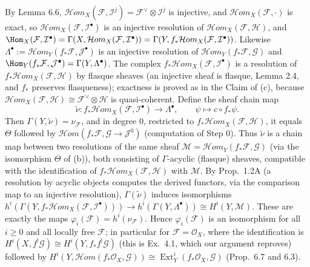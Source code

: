 \documentclass[11pt]{article}
\begin{document}
By Lemma 6.6, $\mathcal{H}om_X(\mathcal F,\mathcal I^j)=\mathcal F^\vee\otimes\mathcal I^j$ is injective, and $\mathcal{H}om_X(\mathcal F,\cdot)$ is exact, so $\mathcal{H}om_X(\mathcal F,\mathcal I^\bullet)$ is an injective resolution of $\mathcal{H}om_X(\mathcal F,\mathcal H)$, and $\Hom_X(\mathcal F,\mathcal I^\bullet)=\Gamma(X,\mathcal{H}om_X(\mathcal F,\mathcal I^\bullet))=\Gamma(Y,f_*\mathcal{H}om_X(\mathcal F,\mathcal I^\bullet))$. Likewise $\Lambda^\bullet:=\mathcal{H}om_Y(f_*\mathcal F,\mathcal J^\bullet)$ is an injective resolution of $\mathcal{H}om_Y(f_*\mathcal F,\mathcal G)$ and $\Hom_Y(f_*\mathcal F,\mathcal J^\bullet)=\Gamma(Y,\Lambda^\bullet)$. The complex $f_*\mathcal{H}om_X(\mathcal F,\mathcal I^\bullet)$ is a resolution of $f_*\mathcal{H}om_X(\mathcal F,\mathcal H)$ by flasque sheaves (an injective sheaf is flasque, Lemma 2.4, and $f_*$ preserves flasqueness); exactness is proved as in the Claim of (c), because $\mathcal{H}om_X(\mathcal F,\mathcal H)\cong\mathcal F^\vee\otimes\mathcal H$ is quasi-coherent. Define the sheaf chain map
\[
\tilde\nu\colon f_*\mathcal{H}om_X(\mathcal F,\mathcal I^\bullet)\to\Lambda^\bullet,\qquad\psi\mapsto c\circ f_*\psi .
\]
Then $\Gamma(Y,\tilde\nu)=\nu_{\mathcal F}$, and in degree $0$, restricted to $f_*\mathcal{H}om_X(\mathcal F,\mathcal H)$, it equals $\Theta$ followed by $\mathcal{H}om(f_*\mathcal F,\mathcal G\to\mathcal J^0)$ (computation of Step 0). Thus $\tilde\nu$ is a chain map between two resolutions of the same sheaf $\mathcal M=\mathcal{H}om_Y(f_*\mathcal F,\mathcal G)$ (via the isomorphism $\Theta$ of (b)), both consisting of $\Gamma$-acyclic (flasque) sheaves, compatible with the identification of $f_*\mathcal{H}om_X(\mathcal F,\mathcal H)$ with $\mathcal M$. By Prop.~1.2A (a resolution by acyclic objects computes the derived functors, via the comparison map to an injective resolution), $\Gamma(\tilde\nu)$ induces isomorphisms $h^i(\Gamma(Y,f_*\mathcal{H}om_X(\mathcal F,\mathcal I^\bullet)))\to h^i(\Gamma(Y,\Lambda^\bullet))\cong H^i(Y,\mathcal M)$. These are exactly the maps $\varphi_i(\mathcal F)=h^i(\nu_{\mathcal F})$. Hence $\varphi_i(\mathcal F)$ is an isomorphism for all $i\ge0$ and all locally free $\mathcal F$; in particular for $\mathcal F=\mathcal O_X$, where the identification is $H^i(X,f^!\mathcal G)\cong H^i(Y,f_*f^!\mathcal G)$ (this is Ex.~4.1, which our argument reproves) followed by $H^i(Y,\mathcal{H}om(f_*\mathcal O_X,\mathcal G))\cong\operatorname{Ext}^i_Y(f_*\mathcal O_X,\mathcal G)$ (Prop.~6.7 and 6.3).
\end{document}
